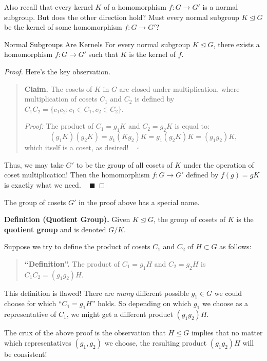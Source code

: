 Also recall that every kernel $K$ of a homomorphism $f: G \to G'$ is a normal subgroup.  But does the other direction hold?  Must every normal subgroup $K \unlhd G$ be the kernel of some homomorphism $f: G \to G'$?

\begin{theorem}{Normal Subgroups Are Kernels}
    For every normal subgroup $K \unlhd G$, there exists a homomorphism $f: G \to G'$ such that $K$ is the kernel of $f$.
\end{theorem}

\begin{proof}
    Here's the key observation.
    \begin{quote}
        \textbf{Claim.} The cosets of $K$ in $G$ are closed under multiplication, where multiplication of cosets $C_1$ and $C_2$ is defined by $C_1C_2 = \{c_1c_2: c_1 \in C_1, c_2 \in C_2\}$.

        \emph{Proof:} The product of $C_1 = g_1K$ and $C_2 = g_2K$ is equal to:
        \[ (g_1K)(g_2K) = g_1(Kg_2)K = g_1(g_2K)K = (g_1g_2)K, \]
        which itself is a coset, as desired! ~ $\square$
    \end{quote}
    Thus, we may take $G'$ to be the group of all cosets of $K$ under the operation of coset multiplication!  Then the homomorphism $f: G \to G'$ defined by $f(g) = gK$ is exactly what we need.  ~ $\blacksquare$
\end{proof}

The group of cosets $G'$ in the proof above has a special name.

\textbf{Definition (Quotient Group).} Given $K \unlhd G$, the group of cosets of $K$ is the \textbf{quotient group} and is denoted $G/K$.

\begin{remark}
    Suppose we try to define the product of cosets $C_1$ and $C_2$ of $H \subset G$ as follows:
    \begin{quote}
        \textbf{``Definition''.} The product of $C_1 = g_1H$ and $C_2 = g_2H$ is $C_1C_2 = (g_1g_2)H$.
    \end{quote}
    This definition is flawed!  There are \emph{many} different possible $g_1 \in G$ we could choose for which ``$C_1 = g_1H$'' holds.  So depending on which $g_1$ we choose as a representative of $C_1$, we might get a different product $(g_1g_2)H$.

    The crux of the above proof is the observation that $H \unlhd G$ implies that no matter which representatives $(g_1, g_2)$ we choose, the resulting product $(g_1g_2)H$ will be consistent!
\end{remark}

